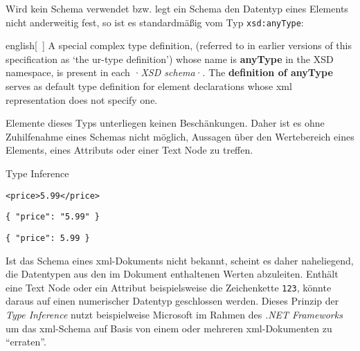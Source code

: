 Wird kein Schema verwendet bzw. legt ein Schema den Datentyp eines Elements nicht anderweitig fest, so ist es standardmäßig vom Typ \texttt{xsd:anyType}:

\begin{foreigndisplayquote}{english}[{~\cite[Abschnitt 2.2.1.1]{xmlschema11-1}}]
    A special complex type definition, (referred to in earlier versions of this specification as `the ur-type definition') whose name is \textbf{anyType} in the XSD namespace, is present in each ·\emph{XSD schema}·. The \textbf{definition of anyType} serves as default type definition for element declarations whose \acrshort{xml} representation does not specify one.
\end{foreigndisplayquote}

Elemente dieses Typs unterliegen keinen Beschänkungen. Daher ist es ohne Zuhilfenahme eines Schemas nicht möglich, Aussagen über den Wertebereich eines Elements, eines Attributs oder einer Text Node zu treffen.

\begin{example} Type Inference
    \begin{verbatim}
<price>5.99</price>
    \end{verbatim}
    \label{fig:typeinferxml}

    \begin{verbatim}
{ "price": "5.99" }
    \end{verbatim}
    \label{fig:typeinferjson1}

    \begin{verbatim}
{ "price": 5.99 }
    \end{verbatim}
    \label{fig:typeinferjson2}

\end{example}

Ist das Schema eines \acrshort{xml}-Dokuments nicht bekannt, scheint es daher naheliegend, die Datentypen aus den im Dokument enthaltenen Werten abzuleiten. Enthält eine Text Node oder ein Attribut beispielsweise die Zeichenkette \texttt{123}, könnte daraus auf einen numerischer Datentyp geschlossen werden. Dieses Prinzip der \emph{Type Inference} nutzt beispielweise Microsoft im Rahmen des \emph{.NET Frameworks} um das \acrshort{xml}-Schema auf Basis von einem oder mehreren \acrshort{xml}-Dokumenten zu \enquote{erraten}.~\cite{msdn2017inferxmlschema}

